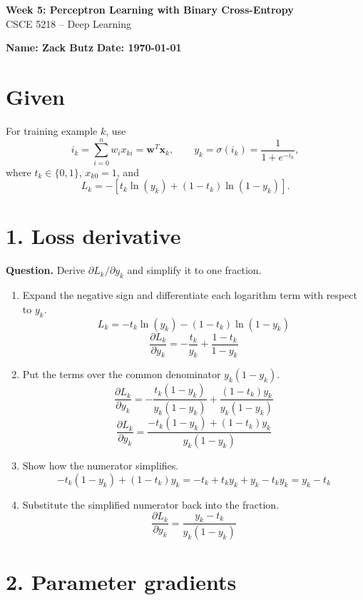 \documentclass[11pt]{article}
\begin{document}
\begin{center}
{\Large \textbf{Week 5: Perceptron Learning with Binary Cross-Entropy}}\\
CSCE 5218 -- Deep Learning
\end{center}

\textbf{Name: Zack Butz} \hfill \textbf{Date: \today} 

\section*{Given}

For training example $k$, use
\[
i_k = \sum_{i=0}^{n} w_i x_{ki} = \mathbf{w}^{T}\mathbf{x}_k,
\qquad
y_k = \sigma(i_k) = \frac{1}{1+e^{-i_k}},
\]
where $t_k \in \{0,1\}$, $x_{k0}=1$, and
\[
L_k = -\left[t_k\ln(y_k)+(1-t_k)\ln(1-y_k)\right].
\]

\section*{1. Loss derivative}

\textbf{Question.} Derive $\partial L_k/\partial y_k$ and simplify it to one fraction.

\begin{enumerate}[label=\arabic*.]
    \item Expand the negative sign and differentiate each logarithm term with respect to $y_k$.
    \[
    L_k = -t_k\ln(y_k) - (1-t_k)\ln(1-y_k)
    \]
    \[
    \frac{\partial L_k}{\partial y_k}
    = -\frac{t_k}{y_k} + \frac{1-t_k}{1-y_k}
    \]

    \item Put the terms over the common denominator $y_k(1-y_k)$.
    \[
    \frac{\partial L_k}{\partial y_k}
    = -\frac{t_k(1-y_k)}{y_k(1-y_k)}
      + \frac{(1-t_k)y_k}{y_k(1-y_k)}
    \]
    \[
    \frac{\partial L_k}{\partial y_k}
    = \frac{-t_k(1-y_k) + (1-t_k)y_k}{y_k(1-y_k)}
    \]

    \item Show how the numerator simplifies.
    \[
    -t_k(1-y_k) + (1-t_k)y_k
    = -t_k + t_ky_k + y_k - t_ky_k
    = y_k-t_k
    \]

    \item Substitute the simplified numerator back into the fraction.
    \[
    \boxed{
    \frac{\partial L_k}{\partial y_k}
    = \frac{y_k-t_k}{y_k(1-y_k)}
    }
    \]
\end{enumerate}

\section*{2. Parameter gradients}
\end{document}
